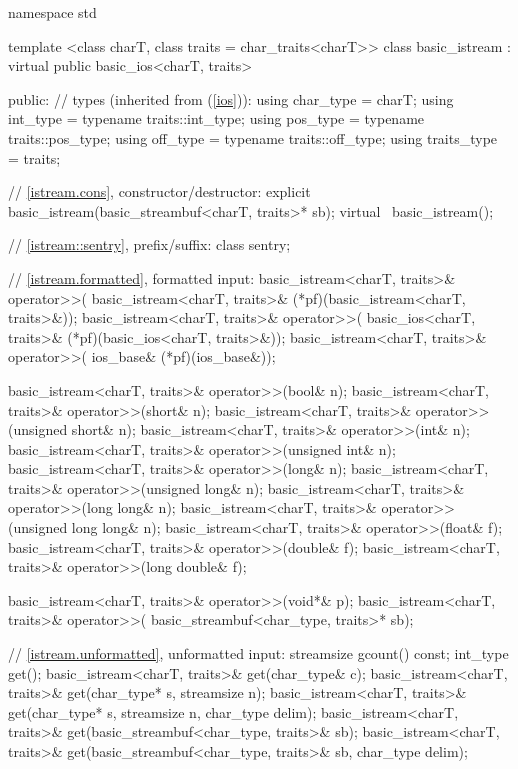 %
\begin{codeblock}
namespace std {
  template <class charT, class traits = char_traits<charT>>
  class basic_istream
    : virtual public basic_ios<charT, traits> {
  public:
    // types (inherited from  (\ref{ios})):
    using char_type   = charT;
    using int_type    = typename traits::int_type;
    using pos_type    = typename traits::pos_type;
    using off_type    = typename traits::off_type;
    using traits_type = traits;

    // \ref{istream.cons}, constructor/destructor:
    explicit basic_istream(basic_streambuf<charT, traits>* sb);
    virtual ~basic_istream();

    // \ref{istream::sentry}, prefix/suffix:
    class sentry;

    // \ref{istream.formatted}, formatted input:
    basic_istream<charT, traits>& operator>>(
      basic_istream<charT, traits>& (*pf)(basic_istream<charT, traits>&));
    basic_istream<charT, traits>& operator>>(
      basic_ios<charT, traits>& (*pf)(basic_ios<charT, traits>&));
    basic_istream<charT, traits>& operator>>(
      ios_base& (*pf)(ios_base&));

    basic_istream<charT, traits>& operator>>(bool& n);
    basic_istream<charT, traits>& operator>>(short& n);
    basic_istream<charT, traits>& operator>>(unsigned short& n);
    basic_istream<charT, traits>& operator>>(int& n);
    basic_istream<charT, traits>& operator>>(unsigned int& n);
    basic_istream<charT, traits>& operator>>(long& n);
    basic_istream<charT, traits>& operator>>(unsigned long& n);
    basic_istream<charT, traits>& operator>>(long long& n);
    basic_istream<charT, traits>& operator>>(unsigned long long& n);
    basic_istream<charT, traits>& operator>>(float& f);
    basic_istream<charT, traits>& operator>>(double& f);
    basic_istream<charT, traits>& operator>>(long double& f);

    basic_istream<charT, traits>& operator>>(void*& p);
    basic_istream<charT, traits>& operator>>(
      basic_streambuf<char_type, traits>* sb);

    // \ref{istream.unformatted}, unformatted input:
    streamsize gcount() const;
    int_type get();
    basic_istream<charT, traits>& get(char_type& c);
    basic_istream<charT, traits>& get(char_type* s, streamsize n);
    basic_istream<charT, traits>& get(char_type* s, streamsize n,
                                      char_type delim);
    basic_istream<charT, traits>& get(basic_streambuf<char_type, traits>& sb);
    basic_istream<charT, traits>& get(basic_streambuf<char_type, traits>& sb,
                                      char_type delim);

}}
\end{codeblock}

